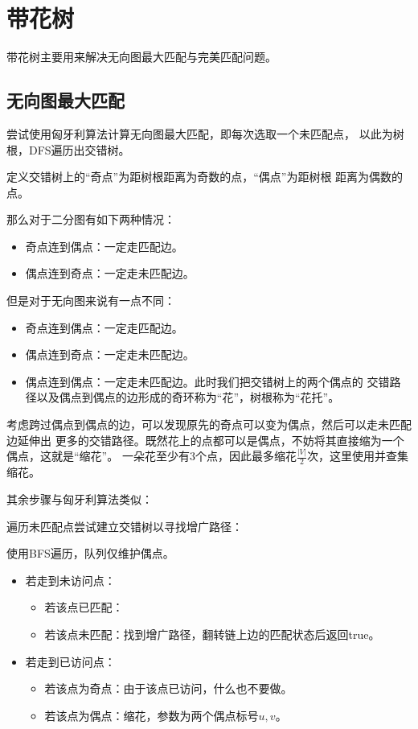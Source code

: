\section{带花树}
带花树主要用来解决无向图最大匹配与完美匹配问题。
\subsection{无向图最大匹配}
尝试使用匈牙利算法计算无向图最大匹配，即每次选取一个未匹配点，
以此为树根，DFS遍历出交错树。

定义交错树上的``奇点''为距树根距离为奇数的点，``偶点''为距树根
距离为偶数的点。

那么对于二分图有如下两种情况：
\begin{itemize}
    \item 奇点连到偶点：一定走匹配边。
    \item 偶点连到奇点：一定走未匹配边。
\end{itemize}

但是对于无向图来说有一点不同：
\begin{itemize}
    \item 奇点连到偶点：一定走匹配边。
    \item 偶点连到奇点：一定走未匹配边。
    \item 偶点连到偶点：一定走未匹配边。此时我们把交错树上的两个偶点的
    交错路径以及偶点到偶点的边形成的奇环称为``花''，树根称为``花托''。
\end{itemize}

考虑跨过偶点到偶点的边，可以发现原先的奇点可以变为偶点，然后可以走未匹配边延伸出
更多的交错路径。既然花上的点都可以是偶点，不妨将其直接缩为一个偶点，这就是``缩花''。
一朵花至少有3个点，因此最多缩花$\frac{|V|}{2}$次，这里使用并查集缩花。

其余步骤与匈牙利算法类似：

遍历未匹配点尝试建立交错树以寻找增广路径：

使用BFS遍历，队列仅维护偶点。
\begin{itemize}
    \item 若走到未访问点：
    \begin{itemize}
        \item 若该点已匹配：
        \item 若该点未匹配：找到增广路径，翻转链上边的匹配状态后返回true。
    \end{itemize}
    \item 若走到已访问点：
    \begin{itemize}
        \item 若该点为奇点：由于该点已访问，什么也不要做。
        \item 若该点为偶点：缩花，参数为两个偶点标号$u,v$。
    \end{itemize}
\end{itemize}

